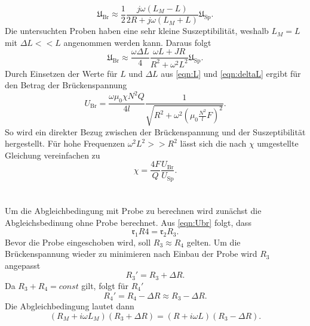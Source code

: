 \begin{equation*}
    \mathfrak{U}_{\text{Br}} \approx \frac{1}{2} \frac{jω(L_M - L)}{2R + jω(L_M + L)} \mathfrak{U}_{\text{Sp}}.
\end{equation*}
Die untersuchten Proben haben eine sehr kleine Suszeptibilität, weshalb $L_M = L$ mit $ΔL << L$ angenommen werden kann.
Daraus folgt
\begin{equation*}
    \mathfrak{U}_{\text{Br}} \approx \frac{ωΔL}{4}\frac{ωL + JR}{R^2 + ω^2L^2} \mathfrak{U}_{\text{Sp}}.
\end{equation*}
Durch Einsetzen der Werte für $L$ und $ΔL$ aus \eqref{eqn:L} und \eqref{eqn:deltaL} ergibt für den Betrag der Brückenspannung
\begin{equation*}
    U_{\text{Br}} = \frac{ωμ_0χN^2Q}{4l} \frac{1}{\sqrt{R^2 + ω^2\left(μ_0\frac{N^2}{l}F\right)^2}}.
\end{equation*}
So wird ein direkter Bezug zwischen der Brückenspannung und der Suszeptibilität hergestellt.
Für hohe Frequenzen $ω^2L^2 >> R^2$ lässt sich die nach $χ$ umgestellte Gleichung vereinfachen zu
\begin{equation}\label{eqn:chi2}
    χ = \frac{4F}{Q} \frac{U_{\text{Br}}}{U_{\text{Sp}}}.
\end{equation}
\\
\\
Um die Abgleichbedingung mit Probe zu berechnen wird zunächst die Abgleichsbedinung ohne Probe berechnet.
Aus \eqref{eqn:Ubr} folgt, dass
\begin{equation*}
    \mathfrak{r}_1R4 = \mathfrak{r}_2R_3.
\end{equation*}
Bevor die Probe eingeschoben wird, soll $R_3 \approx R_4$ gelten.
Um die Brückenspannung wieder zu minimieren nach Einbau der Probe wird $R_3$ angepasst
\begin{equation*}
    R_3' = R_3 + ΔR.
\end{equation*}
Da $R_3 + R_4 = const$ gilt, folgt für $R_4'$
\begin{equation*}
    R_4' = R_4 - ΔR \approx R_3 - ΔR.
\end{equation*}
Die Abgleichbedingung lautet dann
\begin{equation}\label{eqn:AbleichIm}
    (R_M + iωL_M)(R_3 + ΔR) = (R + iωL)(R_3 - ΔR).
\end{equation}
